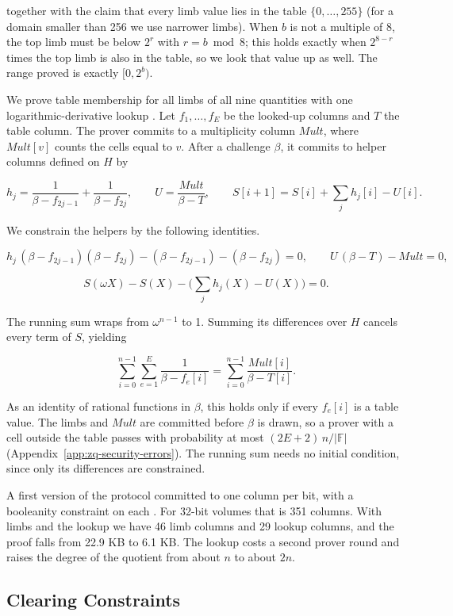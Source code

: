 together with the claim that every limb value lies in the table \(\{0, \ldots, 255\}\) (for a domain smaller than 256 we use narrower limbs). When \(b\) is not a multiple of 8, the top limb must be below \(2^r\) with \(r = b \bmod 8\); this holds exactly when \(2^{8-r}\) times the top limb is also in the table, so we look that value up as well. The range proved is exactly \([0, 2^b)\).

We prove table membership for all limbs of all nine quantities with one logarithmic-derivative lookup \cite{habock2022}. Let \(f_1, \ldots, f_E\) be the looked-up columns and \(T\) the table column. The prover commits to a multiplicity column \(Mult\), where \(Mult[v]\) counts the cells equal to \(v\). After a challenge \(\beta\), it commits to helper columns defined on \(H\) by

\[h_j = \frac{1}{\beta - f_{2j-1}} + \frac{1}{\beta - f_{2j}}, \qquad U = \frac{Mult}{\beta - T}, \qquad S[i+1] = S[i] + \sum_j h_j[i] - U[i].\]

We constrain the helpers by the following identities.

\[h_j \,(\beta - f_{2j-1})(\beta - f_{2j}) - (\beta - f_{2j-1}) - (\beta - f_{2j}) = 0, \qquad U\,(\beta - T) - Mult = 0,\]

\[S(\omega X) - S(X) - \Big(\sum_j h_j(X) - U(X)\Big) = 0. \tag{F23}\]

The running sum wraps from \(\omega^{n-1}\) to 1. Summing its differences over \(H\) cancels every term of \(S\), yielding

\[\sum_{i=0}^{n-1} \sum_{e=1}^{E} \frac{1}{\beta - f_e[i]} = \sum_{i=0}^{n-1} \frac{Mult[i]}{\beta - T[i]}.\]

As an identity of rational functions in \(\beta\), this holds only if every \(f_e[i]\) is a table value. The limbs and \(Mult\) are committed before \(\beta\) is drawn, so a prover with a cell outside the table passes with probability at most \((2E+2)\,n/|\mathbb{F}|\) (Appendix~\ref{app:zq-security-errors}). The running sum needs no initial condition, since only its differences are constrained.

A first version of the protocol committed to one column per bit, with a booleanity constraint on each \cite{plonkbook}. For 32-bit volumes that is 351 columns. With limbs and the lookup we have 46 limb columns and 29 lookup columns, and the proof falls from 22.9 KB to 6.1 KB. The lookup costs a second prover round and raises the degree of the quotient from about \(n\) to about \(2n\).

\subsection{Clearing Constraints}

